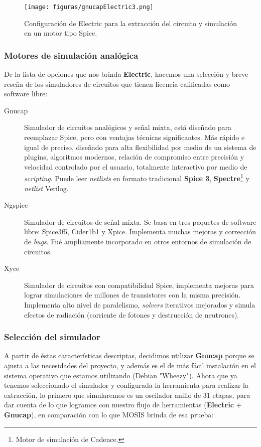 \begin{figure}
  \centering
\texttt{[image: figuras/gnucapElectric3.png]}
  \caption{Configuración de Electric para la extracción del circuito y simulación en un motor tipo Spice.}
\label{fig:gnucapElectric}
\end{figure}



\subsubsection{Motores de simulación analógica}

De la lista de opciones que nos brinda \textbf{Electric}, hacemos una selección y breve reseña de los simuladores de circuitos que tienen licencia calificadas como software libre:


\begin{description}
\item[Gnucap] Simulador de circuitos analógicos y señal mixta, está diseñado para reemplazar Spice, pero con ventajas técnicas significantes. Más rápido e igual de preciso, diseñado para alta flexibilidad por medio de un sistema de plugins, algoritmos modernos, relación de compromiso entre precisión y velocidad controlado por el usuario, totalmente interactivo por medio de \emph{scripting}. Puede leer \emph{netlists} en formato tradicional \textbf{Spice 3}, \textbf{Spectre}\footnote{Motor de simulación de Cadence.} y  \emph{netlist} Verilog.

\item[Ngspice] Simulador de circuitos de señal mixta. Se basa en tres paquetes de software libre: Spice3f5, Cider1b1 y Xpice. Implementa muchas mejoras y corrección de \emph{bugs}. Fué ampliamente incorporado en otros entornos de simulación de circuitos.

\item[Xyce] Simulador de circuitos con compatibilidad Spice, implementa mejoras para lograr simulaciones de millones de transistores con la misma precisión. Implementa alto nivel de paralelismo, \emph{solvers} iterativos mejorados y simula efectos de radiación (corriente de fotones y destrucción de neutrones).
\end{description}

\subsubsection{Selección del simulador}
A partir de éstas características descriptas, decidimos utilizar \textbf{Gnucap} porque se ajusta a las necesidades del proyecto, y además es el de más fácil instalación en el sistema operativo que estamos utilizando (Debian "Wheezy"). Ahora que ya tenemos seleccionado el simulador y configurada la herramienta para realizar la extracción, lo primero que simularemos es un oscilador anillo de 31 etapas, para dar cuenta de lo que logramos con nuestro flujo de herramientas (\textbf{Electric} + \textbf{Gnucap}), en comparación con lo que MOSIS brinda de esa prueba:

